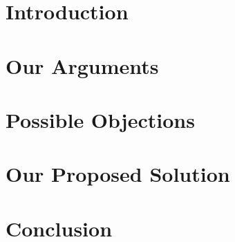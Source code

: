 \documentclass{article}
\title{\highlight{Net Neutrality}}
\author{Martijn Dwars\and
    Jason Raats\and
    Tim Rensen\and
    Rick Wieman\and
\\Delft University of Technology
\\\{M.T.Dwars, J.M.Raats, T.Rensen, R.Wieman\}@student.tudelft.nl
}
\date{\today}
\newcommand{\highlight}[1]{\colorbox{yellow}{#1}}
\begin{document}
\maketitle
\thispagestyle{empty}

\begin{abstract}
\highlight{\ldots}

\textbf{Keywords}: net neutrality, \highlight{\ldots}
\end{abstract}

\section{Introduction}
\label{sec:intro}


\section{Our Arguments}
\label{sec:arguments}


\section{Possible Objections}
\label{sec:objections}


\section{Our Proposed Solution}
\label{sec:solution}


\section{Conclusion}
\label{sec:conclusion}




\end{document}
